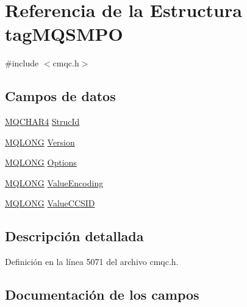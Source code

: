 \hypertarget{structtag_m_q_s_m_p_o}{}\section{Referencia de la Estructura tag\+M\+Q\+S\+M\+P\+O}
\label{structtag_m_q_s_m_p_o}


{\ttfamily \#include $<$cmqc.\+h$>$}

\subsection*{Campos de datos}
\begin{DoxyCompactItemize}
\item 
\hyperlink{cmqc_8h_a12590e546ed66fda7cf21c1d5cefa31d}{M\+Q\+C\+H\+A\+R4} \hyperlink{structtag_m_q_s_m_p_o_a0530922ca944569b52601d74941f96e4}{Struc\+Id}
\item 
\hyperlink{cmqc_8h_a1fb8d28cbda3fa8766a9821230cdb6d5}{M\+Q\+L\+O\+N\+G} \hyperlink{structtag_m_q_s_m_p_o_a0656ef8f766b3907d394d88a35d7b7e9}{Version}
\item 
\hyperlink{cmqc_8h_a1fb8d28cbda3fa8766a9821230cdb6d5}{M\+Q\+L\+O\+N\+G} \hyperlink{structtag_m_q_s_m_p_o_ad7aff2d6c6044809464380998d24ec5c}{Options}
\item 
\hyperlink{cmqc_8h_a1fb8d28cbda3fa8766a9821230cdb6d5}{M\+Q\+L\+O\+N\+G} \hyperlink{structtag_m_q_s_m_p_o_a490df67c11df1c06a7a55933584e844a}{Value\+Encoding}
\item 
\hyperlink{cmqc_8h_a1fb8d28cbda3fa8766a9821230cdb6d5}{M\+Q\+L\+O\+N\+G} \hyperlink{structtag_m_q_s_m_p_o_ac5d324f94c6c72d6e38cb236af37da93}{Value\+C\+C\+S\+I\+D}
\end{DoxyCompactItemize}


\subsection{Descripción detallada}


Definición en la línea 5071 del archivo cmqc.\+h.



\subsection{Documentación de los campos}
\hypertarget{structtag_m_q_s_m_p_o_ad7aff2d6c6044809464380998d24ec5c}{}
